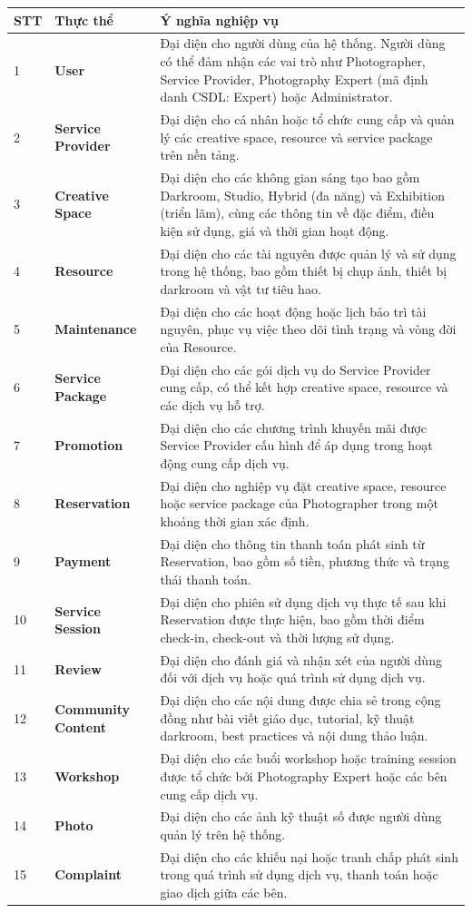 \begin{center}
\scriptsize
\begin{tabular}{p{.07\linewidth} p{.20\linewidth} p{.58\linewidth}}
\toprule
STT & Thực thể & Ý nghĩa nghiệp vụ \\
\midrule
1 & \textbf{User} & Đại diện cho người dùng của hệ thống. Người dùng có thể đảm nhận các vai trò như Photographer, Service Provider, Photography Expert (mã định danh CSDL: Expert) hoặc Administrator. \\
2 & \textbf{Service Provider} & Đại diện cho cá nhân hoặc tổ chức cung cấp và quản lý các creative space, resource và service package trên nền tảng. \\
3 & \textbf{Creative Space} & Đại diện cho các không gian sáng tạo bao gồm Darkroom, Studio, Hybrid (đa năng) và Exhibition (triển lãm), cùng các thông tin về đặc điểm, điều kiện sử dụng, giá và thời gian hoạt động. \\
4 & \textbf{Resource} & Đại diện cho các tài nguyên được quản lý và sử dụng trong hệ thống, bao gồm thiết bị chụp ảnh, thiết bị darkroom và vật tư tiêu hao. \\
5 & \textbf{Maintenance} & Đại diện cho các hoạt động hoặc lịch bảo trì tài nguyên, phục vụ việc theo dõi tình trạng và vòng đời của Resource. \\
6 & \textbf{Service Package} & Đại diện cho các gói dịch vụ do Service Provider cung cấp, có thể kết hợp creative space, resource và các dịch vụ hỗ trợ. \\
7 & \textbf{Promotion} & Đại diện cho các chương trình khuyến mãi được Service Provider cấu hình để áp dụng trong hoạt động cung cấp dịch vụ. \\
8 & \textbf{Reservation} & Đại diện cho nghiệp vụ đặt creative space, resource hoặc service package của Photographer trong một khoảng thời gian xác định. \\
9 & \textbf{Payment} & Đại diện cho thông tin thanh toán phát sinh từ Reservation, bao gồm số tiền, phương thức và trạng thái thanh toán. \\
10 & \textbf{Service Session} & Đại diện cho phiên sử dụng dịch vụ thực tế sau khi Reservation được thực hiện, bao gồm thời điểm check-in, check-out và thời lượng sử dụng. \\
11 & \textbf{Review} & Đại diện cho đánh giá và nhận xét của người dùng đối với dịch vụ hoặc quá trình sử dụng dịch vụ. \\
12 & \textbf{Community Content} & Đại diện cho các nội dung được chia sẻ trong cộng đồng như bài viết giáo dục, tutorial, kỹ thuật darkroom, best practices và nội dung thảo luận. \\
13 & \textbf{Workshop} & Đại diện cho các buổi workshop hoặc training session được tổ chức bởi Photography Expert hoặc các bên cung cấp dịch vụ. \\
14 & \textbf{Photo} & Đại diện cho các ảnh kỹ thuật số được người dùng quản lý trên hệ thống. \\
15 & \textbf{Complaint} & Đại diện cho các khiếu nại hoặc tranh chấp phát sinh trong quá trình sử dụng dịch vụ, thanh toán hoặc giao dịch giữa các bên. \\
\bottomrule
\end{tabular}
\end{center}

